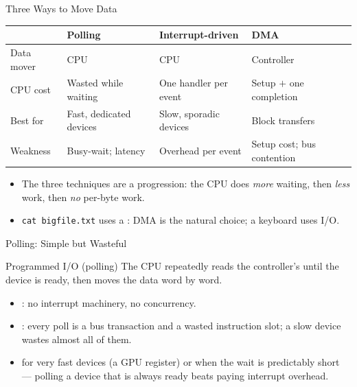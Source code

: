 \documentclass[aspectratio=169]{beamer}
\begin{document}
\begin{frame}{Three Ways to Move Data}
  \centering
  \small
  \setlength{\tabcolsep}{4pt}
  \begin{tabular}{@{}>{\raggedright\arraybackslash}p{2.2cm}
      >{\raggedright\arraybackslash}p{3.7cm}
      >{\raggedright\arraybackslash}p{3.7cm}
      >{\raggedright\arraybackslash}p{3.2cm}@{}}
    \toprule
    & \textbf{Polling} & \textbf{Interrupt-driven} & \textbf{DMA} \\
    \midrule
    Data mover & CPU & CPU & Controller \\
    CPU cost & Wasted while waiting & One handler per event & Setup $+$ one completion \\
    Best for & Fast, dedicated devices & Slow, sporadic devices & Block transfers \\
    Weakness & Busy-wait; latency & Overhead per event & Setup cost; bus contention \\
    \bottomrule
  \end{tabular}
  \vspace{0.35cm}
  \begin{itemize}
    \item The three techniques are a progression: the CPU does \emph{more}
      waiting, then \emph{less} work, then \emph{no} per-byte work.
    \item \texttt{cat bigfile.txt} uses a : DMA is the natural
      choice; a keyboard uses  I/O.
  \end{itemize}
\end{frame}

\begin{frame}{Polling: Simple but Wasteful}
  \begin{block}{Programmed I/O (polling)}
    The CPU repeatedly reads the controller's  until the
    device is ready, then moves the data word by word.
  \end{block}
  \begin{itemize}
    \item {}: no interrupt machinery, no concurrency.
    \item {}: every poll is a bus transaction and a wasted
      instruction slot; a slow device wastes almost all of them.
    \item {} for very fast devices (a GPU register) or when the
      wait is predictably short --- polling a device that is always ready beats
      paying interrupt overhead.
  \end{itemize}
  \vspace{0.15cm}
\end{frame}
\end{document}

